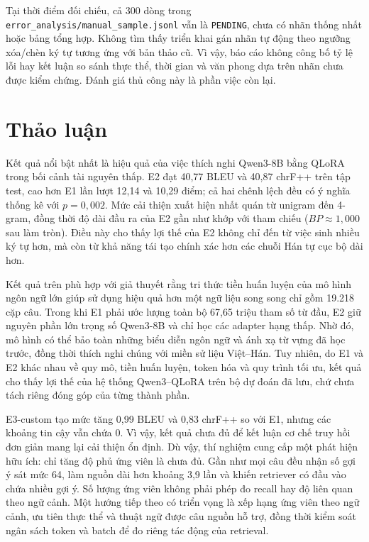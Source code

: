 \documentclass[11pt,twocolumn]{article}
\begin{document}
Tại thời điểm đối chiếu, cả 300 dòng trong
\texttt{error\_analysis/manual\_sample.jsonl} vẫn là \texttt{PENDING},
chưa có nhãn thống nhất hoặc bảng tổng hợp. Không tìm thấy triển khai
gán nhãn tự động theo ngưỡng xóa/chèn ký tự tương ứng với bản thảo cũ.
Vì vậy, báo cáo không công bố tỷ lệ lỗi hay kết luận so sánh thực thể,
thời gian và văn phong dựa trên nhãn chưa được kiểm chứng.
Đánh giá thủ công này là phần việc còn lại.

\section{Thảo luận}

Kết quả nổi bật nhất là hiệu quả của việc thích nghi Qwen3-8B bằng QLoRA
trong bối cảnh tài nguyên thấp. E2 đạt 40,77 BLEU và 40,87 chrF++ trên tập
test, cao hơn E1 lần lượt 12,14 và 10,29 điểm; cả hai chênh lệch đều có ý
nghĩa thống kê với $p=0{,}002$. Mức cải thiện xuất hiện nhất quán từ unigram
đến 4-gram, đồng thời độ dài đầu ra của E2 gần như khớp với tham chiếu
($BP\approx1{,}000$ sau làm tròn). Điều này cho thấy lợi thế của E2 không chỉ đến từ việc sinh
nhiều ký tự hơn, mà còn từ khả năng tái tạo chính xác hơn các chuỗi Hán tự
cục bộ dài hơn.

Kết quả trên phù hợp với giả thuyết rằng tri thức tiền huấn luyện của mô hình
ngôn ngữ lớn giúp sử dụng hiệu quả hơn một ngữ liệu song song chỉ gồm 19.218
cặp câu. Trong khi E1 phải ước lượng toàn bộ 67,65 triệu tham số từ đầu, E2
giữ nguyên phần lớn trọng số Qwen3-8B và chỉ học các adapter hạng thấp. Nhờ
đó, mô hình có thể bảo toàn những biểu diễn ngôn ngữ và ánh xạ từ vựng đã
học trước, đồng thời thích nghi chúng với miền sử liệu Việt--Hán. Tuy nhiên,
do E1 và E2 khác nhau về quy mô, tiền huấn luyện, token hóa và quy trình tối
ưu, kết quả cho thấy lợi thế của hệ thống Qwen3--QLoRA trên bộ dự đoán đã lưu, chứ chưa
tách riêng đóng góp của từng thành phần.

E3-custom tạo mức tăng 0,99 BLEU và 0,83 chrF++ so với E1, nhưng các khoảng
tin cậy vẫn chứa 0. Vì vậy, kết quả chưa đủ để kết luận cơ chế truy hồi đơn
giản mang lại cải thiện ổn định. Dù vậy, thí nghiệm cung cấp một phát hiện
hữu ích: chỉ tăng độ phủ ứng viên là chưa đủ. Gần như mọi câu đều nhận số
gợi ý sát mức 64, làm nguồn dài hơn khoảng 3,9 lần và khiến retriever có
đầu vào chứa nhiều gợi ý. Số lượng ứng viên không phải phép đo recall
hay độ liên quan theo ngữ cảnh. Một hướng tiếp theo có triển vọng
là xếp hạng ứng viên theo ngữ cảnh, ưu tiên thực thể và thuật ngữ được câu
nguồn hỗ trợ, đồng thời kiểm soát ngân sách token và batch để đo riêng tác
động của retrieval.
\end{document}

